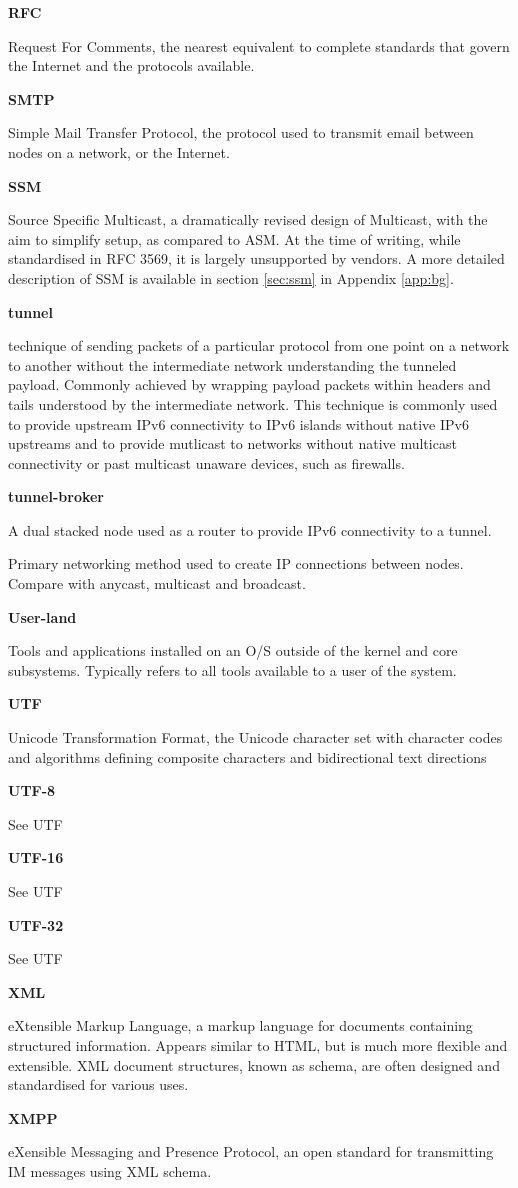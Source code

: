 \textbf{RFC}

Request For Comments, the nearest equivalent to complete standards that
govern the Internet and the protocols available.

\textbf{SMTP}

Simple Mail Transfer Protocol, the protocol used to transmit email
between nodes on a network, or the Internet.

\textbf{SSM}

Source Specific Multicast, a dramatically revised design of Multicast,
with the aim to simplify setup, as compared to ASM. At the time of
writing, while standardised in RFC 3569, it is largely unsupported by
vendors. A more detailed description of SSM is available in section 
\ref{sec:ssm} in Appendix \ref{app:bg}.

\textbf{tunnel}

technique of sending packets of a particular protocol from one point on
a network to another without the intermediate network understanding the
tunneled payload. Commonly achieved by wrapping payload packets within
headers and tails understood by the intermediate network. This
technique is commonly used to provide upstream IPv6 connectivity to IPv6
islands without native IPv6 upstreams and to provide mutlicast
to networks without native multicast connectivity or past multicast
unaware devices, such as firewalls.

\textbf{tunnel-broker}

A dual stacked node used as a router to provide IPv6 connectivity to a
tunnel.


Primary networking method used to create IP connections between nodes.
Compare with anycast, multicast and broadcast.

\textbf{User-land}

Tools and applications installed on an O/S outside of the kernel and
core subsystems. Typically refers to all tools available to a user of
the system.

\textbf{UTF}

Unicode Transformation Format, the Unicode character set with character 
codes and algorithms defining composite characters and bidirectional
text directions

\textbf{UTF-8}

See UTF

\textbf{UTF-16}

See UTF

\textbf{UTF-32}

See UTF

\textbf{XML}

eXtensible Markup Language, a markup language for documents containing
structured information. Appears similar to HTML, but is much more
flexible and extensible. XML document structures, known as schema, are
often designed and standardised for various uses.

\textbf{XMPP}

eXensible Messaging and Presence Protocol, an open standard for
transmitting IM messages using XML schema.

